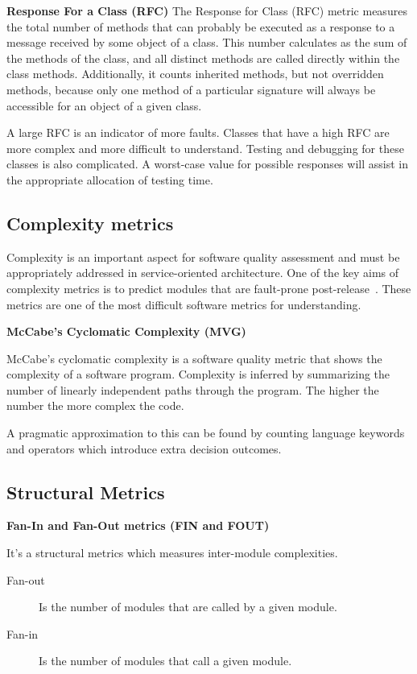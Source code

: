 \textbf{Response For a Class (RFC)} 
The Response for Class (RFC) metric measures the total number of methods that can probably be executed as a response to a message received by some object of a class. This number calculates as the sum of the methods of the class, and all distinct methods are called directly within the class methods. Additionally, it counts inherited methods, but not overridden methods, because only one method of a particular signature will always be accessible for an object of a given class.

A large RFC is an indicator of more faults. Classes that have a high RFC are more complex and more difficult to understand. Testing and debugging for these classes is also complicated. A worst-case value for possible responses will assist in the appropriate allocation of testing time.
\subsection{Complexity metrics}

Complexity is an important aspect for software quality assessment and must be appropriately addressed in service-oriented architecture\cite{complexity}. One of the key aims of complexity  metrics is to predict modules that are fault-prone post-release~\cite{complexity2}. These metrics are one of the most difficult software metrics for understanding.

\textbf{McCabe's Cyclomatic Complexity (MVG)}

McCabe's cyclomatic complexity is a software quality metric that shows the complexity of a software program. Complexity is inferred by summarizing the number of linearly independent paths through the program. The higher the number the more complex the code.

A pragmatic approximation to this can be found by counting language keywords and operators which introduce extra decision outcomes.
\subsection{Structural Metrics}

\textbf{Fan-In and Fan-Out metrics (FIN and FOUT)}

It's a structural metrics which measures inter-module complexities. 
\begin{description}
	\item[Fan-out] Is the number of modules that are called by a given module.
	\item[Fan-in] Is the number of modules that call a given module.
\end{description}

